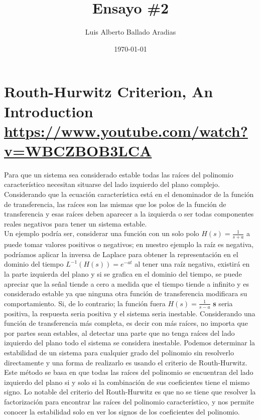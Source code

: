 \documentclass[
	12pt, %
]{fphw}
\title{Ensayo \#2} %
\author{Luis Alberto Ballado Aradias} %
\date{\today} %
\institute{Centro de Investigación y de Estudios Avanzados del IPN \\ Unidad Tamaulipas} %
\begin{document}
\maketitle %

\section*{{\color{Apricot}Routh-Hurwitz Criterion, An Introduction} \url{https://www.youtube.com/watch?v=WBCZBOB3LCA}}

Para que un sistema sea considerado estable todas las raíces del polinomio característico necesitan situarse del lado izquierdo del plano complejo. \\
Considerando que la ecuación característica está en el denominador de la función de transferencia, las raíces son las mismas que los polos de la función de transferencia y esas raíces deben aparecer a la izquierda o ser todas componentes reales negativos para tener un sistema estable. \\
Un ejemplo podría ser, considerar una función con un solo polo $H(s) = \frac{1}{s+a}$ a puede tomar valores positivos o negativos; en nuestro ejemplo la raíz es negativa, podríamos aplicar la inversa de Laplace para obtener la representación en el dominio del tiempo ${L}^{-1} (H(s)) = e^{-at}$ al tener una raíz negativa, existirá en la parte izquierda del plano y si se grafica en el dominio del tiempo, se puede apreciar que la señal tiende a cero a medida que el tiempo tiende a infinito y es considerado estable ya que ninguna otra función de transferencia modificara su comportamiento. Si, de lo contrario; la función fuera $H(s)=\frac{1}{s-a}$  \textbf{s} seria positiva, la respuesta seria positiva y el sistema seria inestable.
Considerando una función de transferencia más completa, es decir con más raíces, no importa que por partes sean estables, al detectar una parte que no tenga raíces del lado izquierdo del plano todo el sistema se considera inestable.
Podemos determinar la estabilidad de un sistema para cualquier grado del polinomio sin resolverlo directamente y una forma de realizarlo es usando el criterio de Routh-Hurwitz. Este método se basa en que todas las raíces del polinomio se encuentran del lado izquierdo del plano si y solo si la combinación de sus coeficientes tiene el mismo signo. Lo notable del criterio del Routh-Hurwitz es que no se tiene que resolver la factorización para encontrar las raíces del polinomio característico, y nos permite conocer la estabilidad solo en ver los signos de los coeficientes del polinomio.
\end{document}
